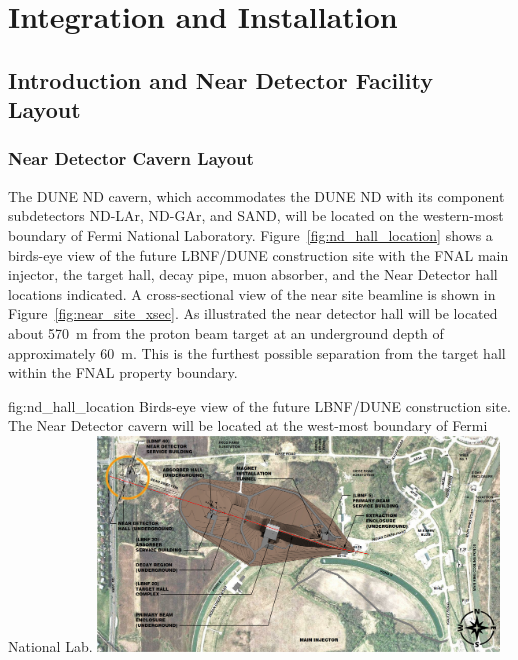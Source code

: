 \chapter{Integration and Installation}
\label{ch:int-inst}

\section{Introduction and Near Detector Facility Layout} 
\label{sec:int-inst-intro}

\subsection{Near Detector Cavern Layout}
\label{sec:chap-id:introduction:layout}

The DUNE ND cavern, which accommodates the DUNE ND with its component subdetectors ND-LAr, ND-GAr, and SAND,  will be located on the western-most boundary of Fermi National Laboratory.   Figure~\ref{fig:nd_hall_location} shows a birds-eye view of the future LBNF/DUNE construction site with the FNAL main injector, the target hall, decay pipe, muon absorber, and the Near Detector hall locations indicated. A cross-sectional view of the near site beamline is shown in Figure~\ref{fig:near_site_xsec}. As illustrated the near detector hall will be located about \SI{570}{\m} from the proton beam target at an underground depth of approximately \SI{60}{\m}. This is the furthest possible separation from the target hall within the FNAL property boundary.

\begin{dunefigure}{fig:nd_hall_location}
{Birds-eye view of the future LBNF/DUNE construction site. The Near Detector cavern will be located at the west-most boundary of Fermi National Lab.}
\includegraphics[width=0.8\textwidth]{graphics/i-and-i/nd_hall_location}
\end{dunefigure}


